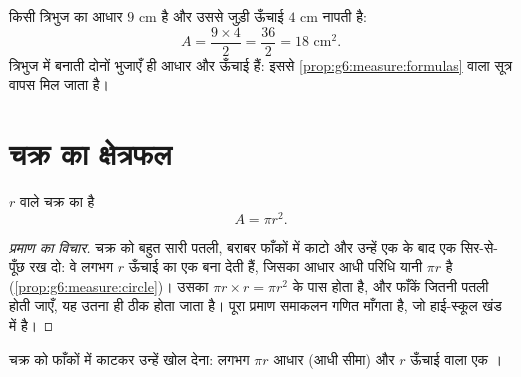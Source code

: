 \begin{example}\label{ex:g7:areas:triangle}
किसी त्रिभुज का आधार $9$ cm है और उससे जुड़ी ऊँचाई $4$ cm नापती
है:
\[
A = \frac{9 \times 4}{2} = \frac{36}{2} = 18 \text{ cm}^2 .
\]
\emph{} त्रिभुज में  बनाती दोनों भुजाएँ ही आधार और ऊँचाई
हैं: इससे \cref{prop:g6:measure:formulas} वाला सूत्र वापस मिल जाता है।
\end{example}

\section{चक्र का क्षेत्रफल}

\begin{theorem}[चक्र]\label{thm:g7:areas:disk}
$r$  वाले चक्र का  है
\[
A = \pi r^2 .
\]
\end{theorem}

\begin{proof}[प्रमाण का विचार]
चक्र को बहुत सारी पतली, बराबर फाँकों में काटो और उन्हें एक के बाद
एक सिर-से-पूँछ रख दो: वे लगभग $r$ ऊँचाई का एक  बना
देती हैं, जिसका आधार आधी परिधि यानी $\pi r$ है
(\cref{prop:g6:measure:circle})। उसका 
$\pi r \times r = \pi r^2$ के पास होता है, और फाँकें जितनी पतली
होती जाएँ, यह उतना ही ठीक होता जाता है। पूरा प्रमाण समाकलन गणित
माँगता है, जो हाई-स्कूल खंड में है।
\end{proof}

\begin{omfigure}

{\small चक्र को फाँकों में काटकर उन्हें खोल देना: लगभग $\pi r$
आधार (आधी सीमा) और $r$ ऊँचाई वाला एक ।}
\end{omfigure}

